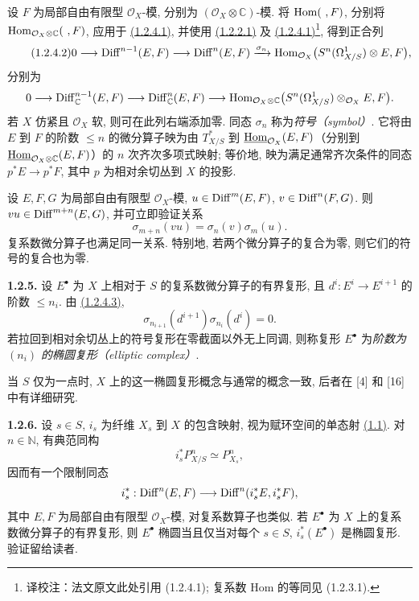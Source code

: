 设 $F$ 为局部自由有限型 $\mathcal O_X$-模, 分别为 $(\mathcal O_X\otimes\mathbb C)$-模. 将 $\operatorname{Hom}(\ ,F)$, 分别将 $\operatorname{Hom}_{\mathcal O_X\otimes\mathbb C}(\ ,F)$, 应用于 \hyperlink{sga6.e02.eq.1-2-4-1}{(1.2.4.1)}, 并使用 \hyperlink{sga6.e02.eq.1-2-2-1}{(1.2.2.1)} 及 \hyperlink{sga6.e02.eq.1-2-4-1}{(1.2.4.1)}\footnote{译校注：法文原文此处引用 (1.2.4.1); 复系数 Hom 的等同见 (1.2.3.1).}, 得到正合列
\begin{equation}\tag{1.2.4.2}
0\longrightarrow \operatorname{Diff}^{n-1}(E,F)\longrightarrow \operatorname{Diff}^n(E,F)
\xrightarrow{\sigma_n}
\operatorname{Hom}_{\mathcal O_X}\bigl(S^n(\Omega^1_{X/S})\otimes E,F\bigr),
\end{equation}
分别为
\[
0\longrightarrow \operatorname{Diff}_{\mathbb C}^{n-1}(E,F)\longrightarrow \operatorname{Diff}_{\mathbb C}^n(E,F)
\longrightarrow \operatorname{Hom}_{\mathcal O_X\otimes\mathbb C}\bigl(S^n(\Omega^1_{X/S})\otimes_{\mathcal O_X}E,F\bigr).
\] 若 $X$ 仿紧且 $\mathcal O_X$ 软, 则可在此列右端添加零. 同态 $\sigma_n$ 称为\emph{符号（symbol）}. 它将由 $E$ 到 $F$ 的阶数 $\le n$ 的微分算子映为由 $T^*_{X/S}$ 到 $\underline{\operatorname{Hom}}_{\mathcal O_X}(E,F)$（分别到 $\underline{\operatorname{Hom}}_{\mathcal O_X\otimes\mathbb C}(E,F)$）的 $n$ 次齐次多项式映射; 等价地, 映为满足通常齐次条件的同态 $p^*E\to p^*F$, 其中 $p$ 为相对余切丛到 $X$ 的投影.

设 $E,F,G$ 为局部自由有限型 $\mathcal O_X$-模, $u\in\operatorname{Diff}^m(E,F)$, $v\in\operatorname{Diff}^n(F,G)$. 则 $vu\in\operatorname{Diff}^{m+n}(E,G)$, 并可立即验证关系
\begin{equation}\tag{1.2.4.3}
 \sigma_{m+n}(vu)=\sigma_n(v)\sigma_m(u).
\end{equation}
复系数微分算子也满足同一关系. 特别地, 若两个微分算子的复合为零, 则它们的符号的复合也为零.

\textbf{1.2.5.} 设 $E^\bullet$ 为 $X$ 上相对于 $S$ 的复系数微分算子的有界复形, 且 $d^i:E^i\to E^{i+1}$ 的阶数 $\leq n_i$. 由 \hyperlink{sga6.e02.eq.1-2-4-3}{(1.2.4.3)},
\[
 \sigma_{n_{i+1}}(d^{i+1})\sigma_{n_i}(d^i)=0.
\]
若拉回到相对余切丛上的符号复形在零截面以外无上同调, 则称复形 $E^\bullet$ 为\emph{阶数为 $(n_i)$ 的椭圆复形（elliptic complex）}.

当 $S$ 仅为一点时, $X$ 上的这一椭圆复形概念与通常的概念一致, 后者在 [4] 和 [16] 中有详细研究.

\textbf{1.2.6.} 设 $s\in S$, $i_s$ 为纤维 $X_s$ 到 $X$ 的包含映射, 视为赋环空间的单态射 \hyperlink{sga6.e02.sec.1.1}{(1.1)}. 对 $n\in\mathbb N$, 有典范同构
\[
 i_s^*P^n_{X/S}\simeq P^n_{X_s},
\]
因而有一个限制同态
\[
 i_s^*:\operatorname{Diff}^n(E,F)\longrightarrow \operatorname{Diff}^n(i_s^*E,i_s^*F),
\]
其中 $E,F$ 为局部自由有限型 $\mathcal O_X$-模, 对复系数算子也类似. 若 $E^\bullet$ 为 $X$ 上的复系数微分算子的有界复形, 则 $E^\bullet$ 椭圆当且仅当对每个 $s\in S$, $i_s^*(E^\bullet)$ 是椭圆复形. 验证留给读者.

